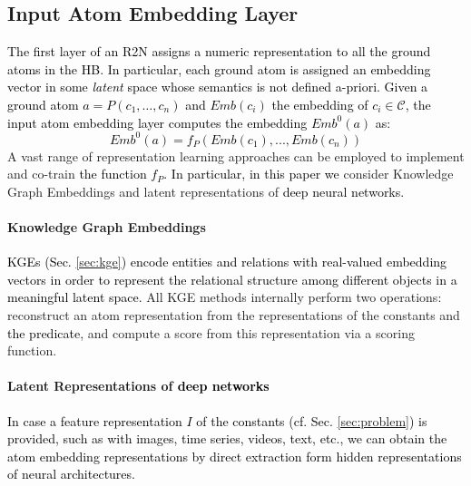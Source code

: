 \documentclass[journal]{IEEEtran}
\newcommand{\mc}{\mathcal}
\newcommand{\ar}[1]{\textcolor{black}{#1}}
\begin{document}
\subsection{Input Atom Embedding Layer}
\label{sec:atemb}
\ar{The first layer of an R2N assigns a numeric representation to all the ground atoms in the HB. In particular, each ground atom is assigned an embedding vector in some \textit{latent} space whose semantics is not defined a-priori. %
Given a ground atom $a = P(c_1,\ldots,c_n)$ and $Emb(c_i)$ the embedding of $c_i\in\mc{C}$, the input atom embedding layer computes the embedding $Emb^0(a)$ as:
\begin{equation}
    Emb^0(a) = f_P( Emb(c_1), ..., Emb(c_n))
\end{equation}} 
A vast range of representation learning approaches can be employed to implement and co-train \ar{the function $f_P$. In particular, in this paper we} consider  Knowledge Graph Embeddings and latent representations of \ar{deep neural networks.}
\paragraph{Knowledge Graph Embeddings}
\ar{KGEs (Sec. \ref{sec:kge}) encode entities and relations with real-valued embedding vectors in order to represent the relational structure among different objects in a meaningful latent space.}
All KGE methods internally perform two operations: reconstruct an atom representation from the representations of the constants and \ar{the predicate}, and compute a score from this representation via a scoring function. 
\paragraph{Latent Representations of \ar{deep networks}}\ar{
In case a feature representation $I$ of the constants (cf. Sec. \ref{sec:problem}) is provided, such as with images, time series, videos, text, etc., we can obtain
the atom embedding representations by direct extraction form hidden representations of neural architectures.}
\end{document}
